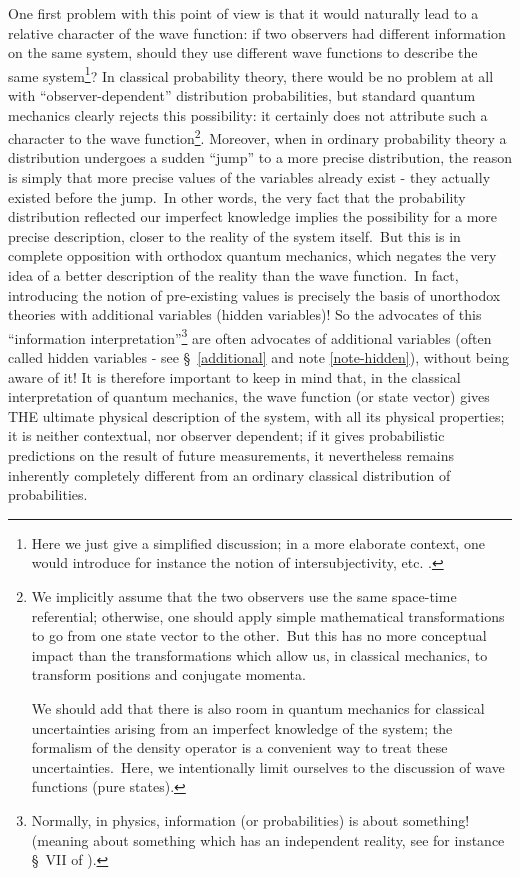 \documentclass[12pt,onecolumn]{article}%
\begin{document}
One first problem with this point of view is that it would naturally lead to a
relative character of the wave function: if two observers had different
information on the same system, should they use different wave functions to
describe the same system\footnote{Here we just give a simplified discussion;
in a more elaborate context, one would introduce for instance the notion of
intersubjectivity, etc. \cite{Shimony} \cite{d'Espagnat}.}? In classical
probability theory, there would be no problem at all with
``observer-dependent'' distribution probabilities, but standard quantum
mechanics clearly rejects this possibility: it certainly does not attribute
such a character to the wave function\footnote{We implicitly assume that the
two observers use the same space-time referential; otherwise, one should apply
simple mathematical transformations to go from one state vector to the
other.\ But this has no more conceptual impact than the transformations which
allow us, in classical mechanics, to transform positions and conjugate
momenta.
\par
We should add that there is also room in quantum mechanics for classical
uncertainties arising from an imperfect knowledge of the system; the formalism
of the density operator is a convenient way to treat these
uncertainties.\ Here, we intentionally limit ourselves to the discussion of
wave functions (pure states).}. Moreover, when in ordinary probability theory
a distribution undergoes a sudden ``jump'' to a more precise distribution, the
reason is simply that more precise values of the variables already exist -
they actually existed before the jump.\ In other words, the very fact that the
probability distribution reflected our imperfect knowledge implies the
possibility for a more precise description, closer to the reality of the
system itself.\ But this is in complete opposition with orthodox quantum
mechanics, which negates the very idea of a better description of the reality
than the wave function.\ In fact, introducing the notion of pre-existing
values is precisely the basis of unorthodox theories with additional variables
(hidden variables)! So the advocates of this ``information
interpretation''\footnote{Normally, in physics, information (or probabilities)
is about something! (meaning about something which has an independent reality,
see for instance \S \ VII of \cite{Stapp-2}).} are often advocates of
additional variables (often called hidden variables - see
\S \ \ref{additional} and note \ref{note-hidden}), without being aware of it!
It is therefore important to keep in mind that, in the classical
interpretation of quantum mechanics, the wave function (or state vector) gives
THE ultimate physical description of the system, with all its physical
properties; it is neither contextual, nor observer dependent; if it gives
probabilistic predictions on the result of future measurements, it
nevertheless remains inherently completely different from an ordinary
classical distribution of probabilities.
\end{document}
